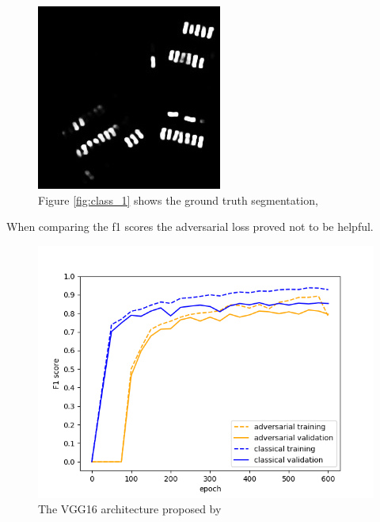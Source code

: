 \documentclass{kththesis}
\begin{document}
\begin{figure}[H]
\endminipage\hfill
{}%
  \includegraphics[width=\linewidth]{gan_vs_class/gan_2}
\endminipage
\caption{Figure \ref{fig:class_1} shows the ground truth segmentation, }
\end{figure}
When comparing the f1 scores the adversarial loss proved not to be helpful.
\begin{center}
\begin{figure}[H]
      \includegraphics[scale=0.6]{classical_vs_adversarial}
  \caption{The VGG16 architecture proposed by \cite{simonyan_very_2014}} \label{fig:gan_vs_class}
\end{figure}
\end{center}
\end{document}
